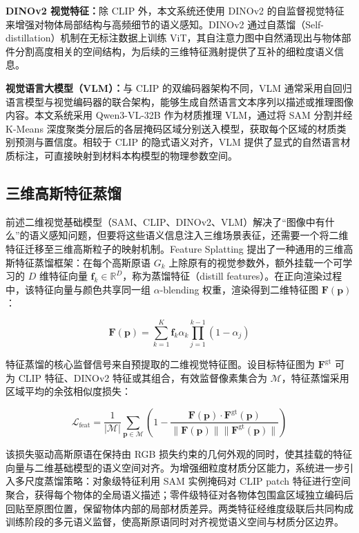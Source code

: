\textbf{DINOv2 视觉特征：}除 CLIP 外，本文系统还使用 DINOv2\cite{dinov2} 的自监督视觉特征来增强对物体局部结构与高频细节的语义感知。DINOv2 通过自蒸馏（Self-distillation）机制在无标注数据上训练 ViT，其自注意力图中自然涌现出与物体部件分割高度相关的空间结构，为后续的三维特征溅射提供了互补的细粒度语义信息。

\textbf{视觉语言大模型（VLM）：}与 CLIP 的双编码器架构不同，VLM 通常采用自回归语言模型与视觉编码器的联合架构，能够生成自然语言文本序列以描述或推理图像内容。本文系统采用 Qwen3-VL-32B\cite{qwen3vl} 作为材质推理 VLM，通过将 SAM 分割并经 K-Means\cite{kmeans} 深度聚类分层后的各层掩码区域分别送入模型，获取每个区域的材质类别预测与置信度。相较于 CLIP 的隐式语义对齐，VLM 提供了显式的自然语言材质标注，可直接映射到材料本构模型的物理参数空间。

\subsection{三维高斯特征蒸馏}
前述二维视觉基础模型（SAM、CLIP、DINOv2、VLM）解决了“图像中有什么”的语义感知问题，但要将这些语义信息注入三维场景表征，还需要一个将二维特征迁移至三维高斯粒子的映射机制。Feature Splatting\cite{featuresplatting} 提出了一种通用的三维高斯特征蒸馏框架：在每个高斯原语 $G_k$ 上除原有的视觉参数外，额外挂载一个可学习的 $D$ 维特征向量 $\mathbf{f}_k \in \mathbb{R}^D$，称为蒸馏特征（distill features）。在正向渲染过程中，该特征向量与颜色共享同一组 $\alpha$-blending 权重，渲染得到二维特征图 $\mathbf{F}(\mathbf{p})$：


\begin{equation}
\mathbf{F}(\mathbf{p}) = \sum_{k=1}^{K} \mathbf{f}_k \alpha_k \prod_{j=1}^{k-1} (1 - \alpha_j)
\end{equation}

特征蒸馏的核心监督信号来自预提取的二维视觉特征图。设目标特征图为 $\mathbf{F}^{\text{gt}}$ 可为 CLIP 特征、DINOv2 特征或其组合，有效监督像素集合为 $\mathcal{M}$，特征蒸馏采用区域平均的余弦相似度损失：

\begin{equation}
\mathcal{L}_{\text{feat}} = \frac{1}{|\mathcal{M}|}\sum_{\mathbf{p}\in\mathcal{M}}\left(1 - \frac{\mathbf{F}(\mathbf{p}) \cdot \mathbf{F}^{\text{gt}}(\mathbf{p})}{\|\mathbf{F}(\mathbf{p})\| \|\mathbf{F}^{\text{gt}}(\mathbf{p})\|}\right)
\end{equation}

该损失驱动高斯原语在保持由 RGB 损失约束的几何外观的同时，使其挂载的特征向量与二维基础模型的语义空间对齐。为增强细粒度材质分区能力，系统进一步引入多尺度蒸馏策略：对象级特征利用 SAM 实例掩码对 CLIP patch 特征进行空间聚合，获得每个物体的全局语义描述；零件级特征对各物体包围盒区域独立编码后回贴至原图位置，保留物体内部的局部材质差异。两类特征经维度级联后共同构成训练阶段的多元语义监督，使高斯原语同时对齐视觉语义空间与材质分区边界。

